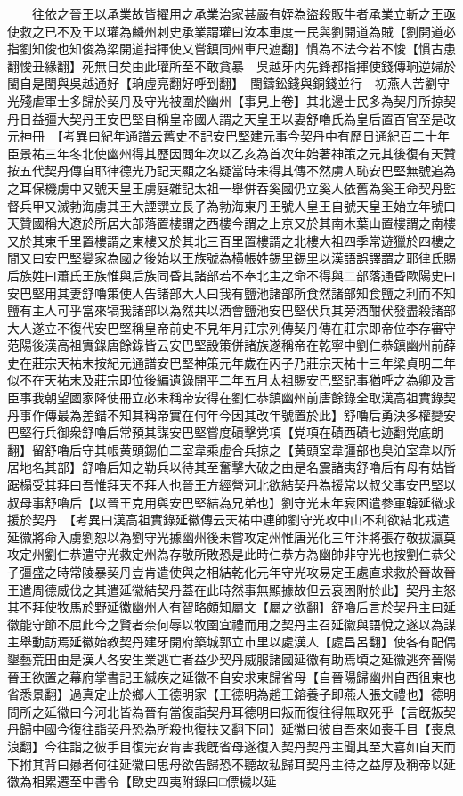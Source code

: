 　　往依之晉王以承業故皆擢用之承業治家甚嚴有姪為盜殺販牛者承業立斬之王亟使救之已不及王以瓘為麟州刺史承業謂瓘曰汝本車度一民與劉開道為賊【劉開道必指劉知俊也知俊為梁開道指揮使又嘗鎮同州車尺遮翻】慣為不法今若不悛【慣古患翻悛丑緣翻】死無日矣由此瓘所至不敢貪暴　吳越牙内先鋒都指揮使錢傳珦逆婦於閩自是閩與吳越通好【珦虛亮翻好呼到翻】　閩鑄鈆錢與銅錢並行　初燕人苦劉守光殘虐軍士多歸於契丹及守光被圍於幽州【事見上卷】其北邊士民多為契丹所掠契丹日益彊大契丹王安巴堅自稱皇帝國人謂之天皇王以妻舒嚕氏為皇后置百官至是改元神冊　【考異曰紀年通譜云舊史不記安巴堅建元事今契丹中有歷日通紀百二十年臣景祐三年冬北使幽州得其歷因閲年次以乙亥為首次年始著神策之元其後復有天贊按五代契丹傳自耶律德光乃記天顯之名疑當時未得其傳不然虜人恥安巴堅無號追為之耳保機虜中又號天皇王虜庭雜記太祖一舉併吞奚國仍立奚人依舊為奚王命契丹監督兵甲又滅勃海虜其王大諲譔立長子為勃海東丹王號人皇王自號天皇王始立年號曰天贊國稱大遼於所居大部落置樓謂之西樓今謂之上京又於其南木葉山置樓謂之南樓又於其東千里置樓謂之東樓又於其北三百里置樓謂之北樓大祖四季常遊獵於四樓之間又曰安巴堅變家為國之後始以王族號為横帳姓錫里錫里以漢語誤譯謂之耶律氏賜后族姓曰蕭氏王族惟與后族同昏其諸部若不奉北主之命不得與二部落通昏歐陽史曰安巴堅用其妻舒嚕策使人告諸部大人曰我有鹽池諸部所食然諸部知食鹽之利而不知鹽有主人可乎當來犒我諸部以為然共以酒會鹽池安巴堅伏兵其旁酒酣伏發盡殺諸部大人遂立不復代安巴堅稱皇帝前史不見年月莊宗列傳契丹傳在莊宗即帝位李存審守范陽後漢高祖實錄唐餘錄皆云安巴堅設策併諸族遂稱帝在乾寧中劉仁恭鎮幽州前薛史在莊宗天祐末按紀元通譜安巴堅神策元年歲在丙子乃莊宗天祐十三年梁貞明二年似不在天祐末及莊宗即位後編遺錄開平二年五月太祖賜安巴堅記事猶呼之為卿及言臣事我朝望國家降使冊立必未稱帝安得在劉仁恭鎮幽州前唐餘錄全取漢高祖實錄契丹事作傳最為差錯不知其稱帝實在何年今因其改年號置於此】舒嚕后勇決多權變安巴堅行兵御衆舒嚕后常預其謀安巴堅嘗度磧擊党項【党項在磧西磧七迹翻党底朗翻】留舒嚕后守其帳黄頭錫伯二室韋乘虛合兵掠之【黄頭室韋彊部也臭泊室韋以所居地名其部】舒嚕后知之勒兵以待其至奮擊大破之由是名震諸夷舒嚕后有母有姑皆踞榻受其拜曰吾惟拜天不拜人也晉王方經營河北欲結契丹為援常以叔父事安巴堅以叔母事舒嚕后【以晉王克用與安巴堅結為兄弟也】劉守光末年衰困遣參軍韓延徽求援於契丹　【考異曰漢高祖實錄延徽傳云天祐中連帥劉守光攻中山不利欲結北戎遣延徽將命入虜劉恕以為劉守光據幽州後未嘗攻定州惟唐光化三年汴將張存敬拔瀛莫攻定州劉仁恭遣守光救定州為存敬所敗恐是此時仁恭方為幽帥非守光也按劉仁恭父子彊盛之時常陵暴契丹豈肯遣使與之相結乾化元年守光攻易定王處直求救於晉故晉王遣周德威伐之其遣延徽結契丹蓋在此時然事無顯據故但云衰困附於此】契丹主怒其不拜使牧馬於野延徽幽州人有智略頗知屬文【屬之欲翻】舒嚕后言於契丹主曰延徽能守節不屈此今之賢者奈何辱以牧圉宜禮而用之契丹主召延徽與語悅之遂以為謀主舉動訪焉延徽始教契丹建牙開府築城郭立市里以處漢人【處昌呂翻】使各有配偶墾藝荒田由是漢人各安生業逃亡者益少契丹威服諸國延徽有助焉頃之延徽逃奔晉陽晉王欲置之幕府掌書記王緘疾之延徽不自安求東歸省母【自晉陽歸幽州自西徂東也省悉景翻】過真定止於鄉人王德明家【王德明為趙王鎔養子即燕人張文禮也】德明問所之延徽曰今河北皆為晉有當復詣契丹耳德明曰叛而復往得無取死乎【言旣叛契丹歸中國今復往詣契丹恐為所殺也復扶又翻下同】延徽曰彼自吾來如喪手目【喪息浪翻】今往詣之彼手目復完安肯害我旣省母遂復入契丹契丹主聞其至大喜如自天而下拊其背曰曏者何往延徽曰思母欲告歸恐不聽故私歸耳契丹主待之益厚及稱帝以延徽為相累遷至中書令【歐史四夷附錄曰□僄檅以延